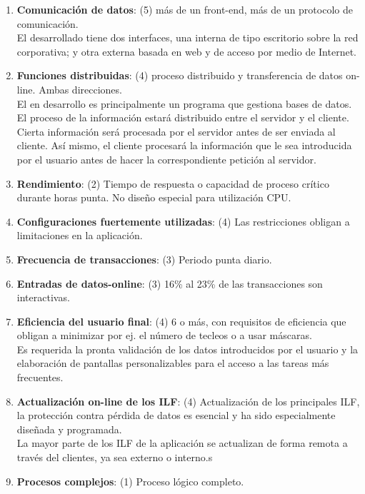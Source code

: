 \documentclass[11pt, a4paper, twoside]{report}
\begin{document}
				\begin{enumerate}
					\item \textbf{Comunicación de datos}: (5) más de un front-end, más de un protocolo de comunicación.\\
						El \software desarrollado tiene dos interfaces, una interna de tipo escritorio sobre la
					red corporativa; y otra externa basada en web y de acceso por medio de Internet.

					\item \textbf{Funciones distribuidas}: (4) proceso distribuido y transferencia de datos on-line. Ambas direcciones.\\
						El \software en desarrollo es principalmente un programa que gestiona bases de datos. El proceso de la información estará distribuido entre el servidor y el cliente. Cierta información será procesada por el servidor antes de ser enviada al cliente. Así mismo, el cliente procesará la información que le sea introducida por el usuario antes de hacer la correspondiente petición al servidor.

					\item \textbf{Rendimiento}: (2) Tiempo de respuesta o capacidad de proceso crítico durante horas punta.
No diseño especial para utilización CPU.
	
					\item \textbf{Configuraciones fuertemente utilizadas}: (4) Las restricciones obligan a limitaciones en la
aplicación.
					\item \textbf{Frecuencia de transacciones}: (3) Periodo punta diario.
					\item \textbf{Entradas de datos-online}: (3) 16\% al 23\% de las transacciones son interactivas.
					\item \textbf{Eficiencia del usuario final}: (4) 6 o más, con requisitos de eficiencia que obligan a
minimizar por ej. el número de tecleos o a usar máscaras.\\
						Es requerida la pronta validación de los datos introducidos por el usuario y la elaboración de pantallas personalizables para el acceso a las tareas más frecuentes.
					\item \textbf{Actualización on-line de los ILF}: (4) Actualización de los principales ILF, la protección
contra pérdida de datos es esencial y ha sido especialmente diseñada y programada.\\
						La mayor parte de los ILF de la aplicación se actualizan de forma remota a través del \software clientes, ya sea externo o interno.s
					\item \textbf{Procesos complejos}: (1) Proceso lógico completo.


\end{enumerate}
\end{document}
